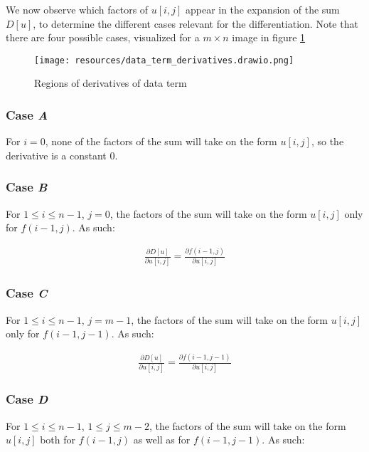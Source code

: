 \documentclass[a4paper]{scrreprt}
\begin{document}
We now observe which factors of $u[i, j]$ appear in the expansion of the sum
$D[u]$, to determine the different cases relevant for the differentiation. Note
that there are four possible cases, visualized for a $m \times n$ image in
figure \ref{fig:data_term_derivatives}

\begin{figure}
		\centering
		\texttt{[image: resources/data\_term\_derivatives.drawio.png]}
		\caption{Regions of derivatives of data term}
		\label{fig:data_term_derivatives}
\end{figure}


\subsubsection{Case \emph{A}}

For $i = 0$, none of the factors of the sum will take on the form $u[i, j]$, so
the derivative is a constant $0$.


\subsubsection{Case \emph{B}}

For $1 \leq i \leq n-1$, $j = 0$, the factors of the sum will take on the form
$u[i, j]$ only for $f(i - 1, j)$. As such:

\begin{align*}
		\frac{\partial D[u]}{\partial u[i, j]} = \frac{\partial f(i - 1, j)}{\partial u[i, j]}
\end{align*}


\subsubsection{Case \emph{C}}

For $1 \leq i \leq n-1$, $j = m - 1$, the factors of the sum will take on the form
$u[i, j]$ only for $f(i - 1, j - 1)$. As such:

\begin{align*}
		\frac{\partial D[u]}{\partial u[i, j]} = \frac{\partial f(i - 1, j - 1)}{\partial u[i, j]}
\end{align*}


\subsubsection{Case \emph{D}}

For $1 \leq i \leq n-1$, $1 \leq j \leq m - 2$, the factors of the sum will
take on the form $u[i, j]$ both for $f(i - 1, j)$ as well as for $f(i - 1, j -
1)$. As such:
\end{document}
